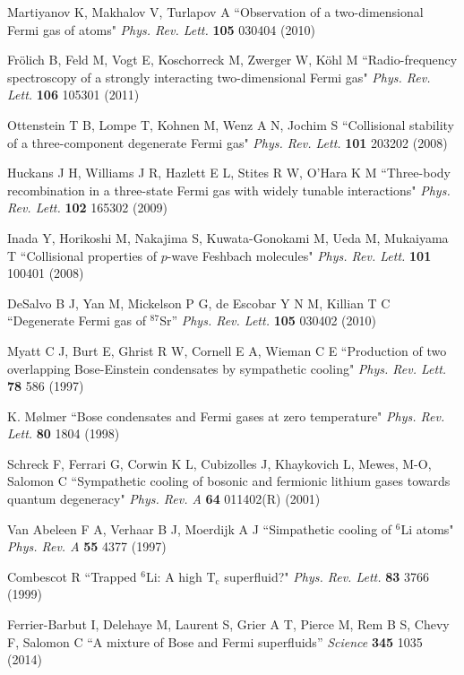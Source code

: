 \documentclass[pra,letterpaper,twocolumn,showpacs,superscriptaddress]{revtex4}
\begin{document}
\begin{thebibliography}{300}
 Martiyanov K, Makhalov V, Turlapov A
``Observation of a two-dimensional Fermi gas of atoms"
{\it Phys. Rev. Lett.} \textbf{105} 030404 (2010)

 Fr\"olich B, Feld M, Vogt E, Koschorreck M, Zwerger W, K\"ohl M
``Radio-frequency spectroscopy of a strongly interacting two-dimensional Fermi gas"
{\it Phys. Rev. Lett.} \textbf{106} 105301 (2011)

 Ottenstein T B, Lompe T, Kohnen M, Wenz A N, Jochim S
``Collisional stability of a three-component degenerate Fermi gas"
{\it Phys. Rev. Lett.} \textbf{101} 203202 (2008)

 Huckans J H, Williams J R, Hazlett E L, Stites R W, O'Hara K M
``Three-body recombination in a three-state Fermi gas with widely tunable interactions"
{\it Phys. Rev. Lett.} \textbf{102} 165302 (2009)

 Inada Y, Horikoshi M, Nakajima S, Kuwata-Gonokami M, Ueda M, Mukaiyama T
``Collisional properties of $p$-wave Feshbach molecules"
{\it Phys. Rev. Lett.} \textbf{101} 100401 (2008)

 DeSalvo B J, Yan M, Mickelson P G, de Escobar Y N M, Killian T C
``Degenerate Fermi gas of ${}^{87}$Sr''
{\it Phys. Rev. Lett.} \textbf{105} 030402 (2010)

 Myatt C J, Burt E, Ghrist R W, Cornell E A, Wieman C E 
``Production of two overlapping Bose-Einstein condensates by sympathetic cooling" {\it Phys. Rev. Lett.} \textbf{78} 586 (1997)

 K. M\o lmer ``Bose condensates and Fermi gases at zero temperature"
{\it Phys. Rev. Lett.} \textbf{80} 1804 (1998)

 Schreck F, Ferrari G, Corwin K L, Cubizolles J, Khaykovich L, Mewes, M-O, Salomon C 
``Sympathetic cooling of bosonic and fermionic lithium gases towards quantum degeneracy" 
{\it Phys. Rev. A} \textbf{64} 011402(R) (2001)

 Van Abeleen F A, Verhaar B J, Moerdijk A J 
``Simpathetic cooling of ${}^6$Li atoms" {\it Phys. Rev. A} \textbf{55} 4377 (1997)

 Combescot R ``Trapped ${}^6$Li: A high ${\mathrm{T_c}}$ superfluid?" 
{\it Phys. Rev. Lett.} \textbf{83} 3766 (1999)

  Ferrier-Barbut I, Delehaye M, Laurent S, Grier A T, Pierce M, Rem B S, Chevy F, Salomon C
``A mixture of Bose and Fermi superfluids'' {\it Science} \textbf{345} 1035 (2014)


\end{thebibliography}
\end{document}
